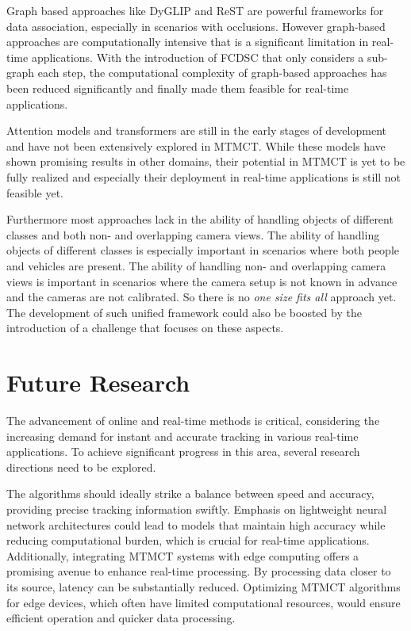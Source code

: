 Graph based approaches like DyGLIP and ReST are powerful frameworks for data association, especially in scenarios with occlusions. However graph-based approaches are computationally intensive that is a significant limitation in real-time applications. With the introduction of FCDSC that only considers a sub-graph each step, the computational complexity of graph-based approaches has been reduced significantly and finally made them feasible for real-time applications.

Attention models and transformers are still in the early stages of development and have not been extensively explored in MTMCT. While these models have shown promising results in other domains, their potential in MTMCT is yet to be fully realized and especially their deployment in real-time applications is still not feasible yet.

Furthermore most approaches lack in the ability of handling objects of different classes and both non- and overlapping camera views. The ability of handling objects of different classes is especially important in scenarios where both people and vehicles are present. The ability of handling non- and overlapping camera views is important in scenarios where the camera setup is not known in advance and the cameras are not calibrated. So there is no \textit{one size fits all} approach yet. The development of such unified framework could also be boosted by the introduction of a challenge that focuses on these aspects.

\section{Future Research}\label{sec:future_research}
The advancement of online and real-time methods is critical, considering the increasing demand for instant and accurate tracking in various real-time applications. To achieve significant progress in this area, several research directions need to be explored.

The algorithms should ideally strike a balance between speed and accuracy, providing precise tracking information swiftly. Emphasis on lightweight neural network architectures could lead to models that maintain high accuracy while reducing computational burden, which is crucial for real-time applications. Additionally, integrating MTMCT systems with edge computing offers a promising avenue to enhance real-time processing. By processing data closer to its source, latency can be substantially reduced. Optimizing MTMCT algorithms for edge devices, which often have limited computational resources, would ensure efficient operation and quicker data processing.

